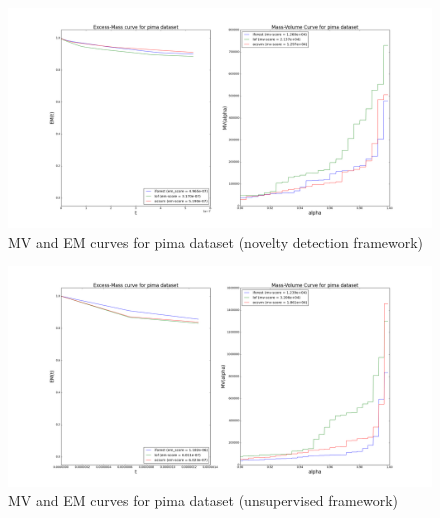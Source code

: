 \begin{figure}[!ht]
\label{evaluation:mv_em_pima}
  \centering
  \caption{MV and EM curves for pima dataset (novelty detection framework)}
  \includegraphics[trim=172 52 165 70, clip, width=\linewidth]{fig_source/evaluation_fig/mv_em_pima_supervised_09_factorized.png}
\end{figure}
\begin{figure}[!ht]
\label{evaluation:mv_em_pima_unsupervised}
  \centering
  \caption{MV and EM curves for pima dataset (unsupervised framework)}
  \includegraphics[trim=172 52 165 70, clip, width=\linewidth]{fig_source/evaluation_fig/mv_em_pima_unsupervised_09_factorized.png}
\end{figure}

